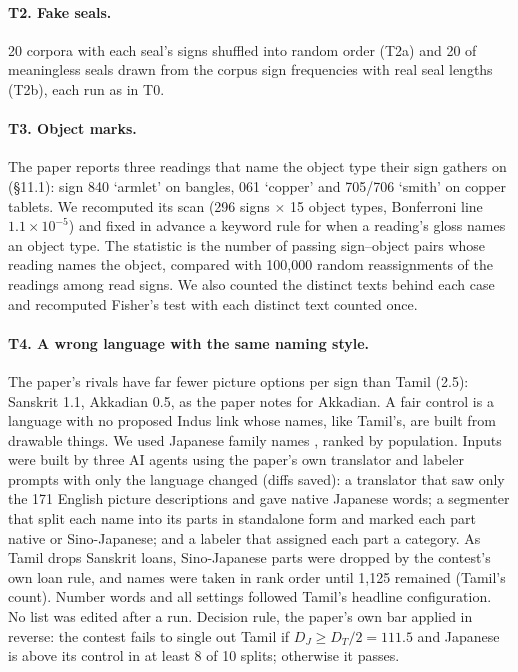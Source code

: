 \documentclass[11pt,a4paper]{article}
\begin{document}
\paragraph{T2. Fake seals.} 20 corpora with each seal's signs shuffled into random order (T2a) and 20 of meaningless seals drawn from the corpus sign frequencies with real seal lengths (T2b), each run as in T0.

\paragraph{T3. Object marks.} The paper reports three readings that name the object type their sign gathers on (\S11.1): sign 840 `armlet' on bangles, 061 `copper' and 705/706 `smith' on copper tablets. We recomputed its scan (296 signs $\times$ 15 object types, Bonferroni line $1.1\times10^{-5}$) and fixed in advance a keyword rule for when a reading's gloss names an object type. The statistic is the number of passing sign--object pairs whose reading names the object, compared with 100,000 random reassignments of the readings among read signs. We also counted the distinct texts behind each case and recomputed Fisher's test with each distinct text counted once.

\paragraph{T4. A wrong language with the same naming style.} The paper's rivals have far fewer picture options per sign than Tamil (2.5): Sanskrit 1.1, Akkadian 0.5, as the paper notes for Akkadian. A fair control is a language with no proposed Indus link whose names, like Tamil's, are built from drawable things. We used Japanese family names \citep{jpnames}, ranked by population. Inputs were built by three AI agents using the paper's own translator and labeler prompts with only the language changed (diffs saved): a translator that saw only the 171 English picture descriptions and gave native Japanese words; a segmenter that split each name into its parts in standalone form and marked each part native or Sino-Japanese; and a labeler that assigned each part a category. As Tamil drops Sanskrit loans, Sino-Japanese parts were dropped by the contest's own loan rule, and names were taken in rank order until 1,125 remained (Tamil's count). Number words and all settings followed Tamil's headline configuration. No list was edited after a run. Decision rule, the paper's own bar applied in reverse: the contest fails to single out Tamil if $D_J\ge D_T/2=111.5$ and Japanese is above its control in at least 8 of 10 splits; otherwise it passes.
\end{document}
